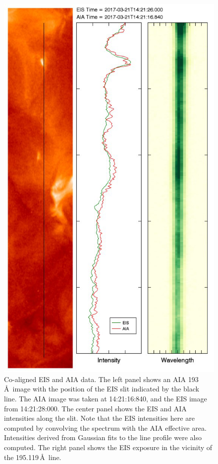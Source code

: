 \documentclass[twocolumn]{aastex62}
\begin{document}
\begin{figure}
    \centering
    \includegraphics[width=0.85\linewidth]{./figures/eis_aia_108.pdf}
    \caption{Co-aligned EIS and AIA data. The left panel shows an AIA 193\,\AA\ image with the position of the EIS slit indicated by the black line. The AIA image was taken at 14:21:16:840, and the EIS image from 14:21:28:000. The center panel shows the EIS and AIA intensities along the slit. Note that the EIS intensities here are computed by convolving the spectrum with the AIA effective area. Intensities derived from Gaussian fits to the line profile were also computed. The right panel shows the EIS exposure in the vicinity of the  195.119\,\AA\ line. }
    \label{fig:eis_aia}
\end{figure}
\end{document}
